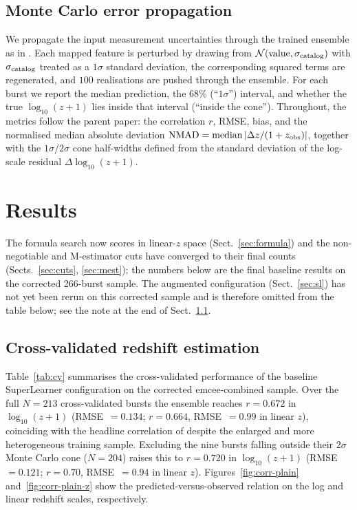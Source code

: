 \documentclass{aa}
\newcommand{\logz}{\log_{10}(z+1)}
\begin{document}
\subsection{Monte Carlo error propagation}
\label{sec:mc}

We propagate the input measurement uncertainties through the trained ensemble as in
\citet[Sect.~4.7]{narendra2025}. Each mapped feature is perturbed by drawing from
$\mathcal{N}(\mathrm{value}, \sigma_{\rm catalog})$ with $\sigma_{\rm catalog}$
treated as a $1\sigma$ standard deviation, the corresponding squared terms are
regenerated, and $100$ realisations are pushed through the ensemble. For each burst
we report the median prediction, the $68\%$ (``$1\sigma$'') interval, and whether the
true $\logz$ lies inside that interval (``inside the cone''). Throughout, the metrics
follow the parent paper: the correlation $r$, RMSE, bias, and the normalised median
absolute deviation ${\rm NMAD}=\mathrm{median}\,|\Delta z/(1+z_{\rm obs})|$, together
with the $1\sigma$/$2\sigma$ cone half-widths defined from the standard deviation of
the log-scale residual $\Delta\logz$.

\section{Results}
\label{sec:results}

The formula search now scores in linear-$z$ space (Sect.~\ref{sec:formula}) and the
non-negotiable and M-estimator cuts have converged to their final counts
(Sects.~\ref{sec:cuts}, \ref{sec:mest}); the numbers below are the final baseline
results on the corrected 266-burst sample. The augmented configuration
(Sect.~\ref{sec:sl}) has not yet been rerun on this corrected sample and is
therefore omitted from the table below; see the note at the end of
Sect.~\ref{sec:res-cv}.

\subsection{Cross-validated redshift estimation}
\label{sec:res-cv}

Table~\ref{tab:cv} summarises the cross-validated performance of the baseline
SuperLearner configuration on the corrected emcee-combined sample. Over the full
$N=213$ cross-validated bursts the ensemble reaches $r=0.672$ in $\logz$
(RMSE~$=0.134$; $r=0.664$, RMSE~$=0.99$ in linear $z$), coinciding with the headline
correlation of \citet{narendra2025} despite the enlarged and more heterogeneous
training sample. Excluding the nine bursts falling outside their $2\sigma$ Monte
Carlo cone ($N=204$) raises this to $r=0.720$ in $\logz$ (RMSE~$=0.121$; $r=0.70$,
RMSE~$=0.94$ in linear $z$). Figures~\ref{fig:corr-plain} and~\ref{fig:corr-plain-z}
show the predicted-versus-observed relation on the log and linear redshift scales,
respectively.
\end{document}

